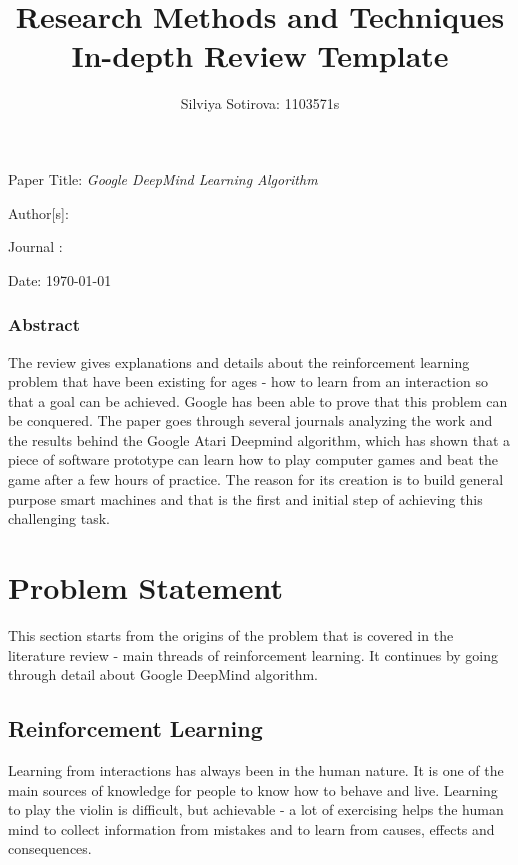 \documentclass{article}
\title{{\Large{}\textbf{Research  Methods and Techniques In-depth Review Template}}}
\author{Silviya Sotirova: 1103571s}
\begin{document}
\maketitle
 
 
Paper Title: {\em Google DeepMind Learning Algorithm} 
 
  
Author[s]: {\em }

Journal :

Date: \today{}
 
\subsubsection*{{\large{}\textbf{Abstract}}}

The review gives explanations and details about the reinforcement learning problem that have been existing for ages - how to learn from an interaction so that a goal can be achieved. Google has been able to prove that this problem can be conquered. The paper goes through several journals analyzing the work and the results behind the Google Atari Deepmind algorithm, which has shown that a piece of software prototype can learn how to play computer games and beat the game after a few hours of practice. The reason for its creation is to build general purpose smart machines and that is the first and initial step of achieving this challenging task.  


\vspace{12pt}
\section{{\textbf{Problem Statement}}}

This section starts from the origins of the problem that is covered in the literature review - main threads of reinforcement learning. It continues by going through detail about Google DeepMind algorithm.

\subsection{Reinforcement Learning}
Learning from interactions has always been in the human nature. It is one of the main sources of knowledge for people to know how to behave and live. Learning to play the violin is difficult, but achievable - a lot of exercising helps the human mind to collect information from mistakes and to learn from causes, effects and consequences.\cite[Ch.\ 1, p. 3]{sutton1998reinforcement}
\end{document}
